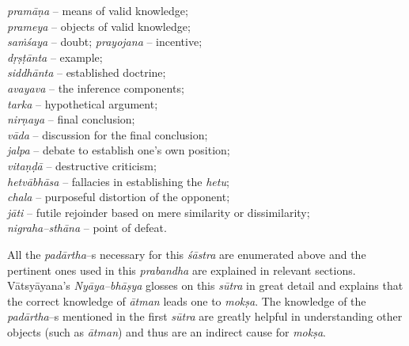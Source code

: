 \textit{pramāṇa} – means of valid knowledge;\\
 \textit{prameya} – objects of valid knowledge;\\
  \textit{saṁśaya} – doubt; \textit{prayojana} – incentive;\\
  \textit{dṛṣṭānta} – example;\\
   \textit{siddhānta} – established doctrine; \\
   \textit{avayava} – the inference components; \\
   \textit{tarka} – hypothetical argument;\\
    \textit{nirṇaya} – final conclusion; \\
    \textit{vāda} – discussion for the final conclusion;\\
     \textit{jalpa} – debate to establish one’s own position;\\
      \textit{vitaṇḍā} – destructive criticism;\\
       \textit{hetvābhāsa} – fallacies in establishing the \textit{hetu};\\
        \textit{chala} – purposeful distortion of the opponent; \\
        \textit{jāti} – futile rejoinder based on mere similarity or dissimilarity; \\
        \textit{nigraha–sthāna} – point of defeat.

All the \textit{padārtha}–s necessary for this\textit{ śāstra} are enumerated above and the pertinent ones used in this \textit{prabandha} are explained in relevant sections. Vātsyāyana’s \textit{Nyāya–bhāṣya} glosses on this \textit{sūtra} in great detail and explains that the correct knowledge of \textit{ātman} leads one to \textit{mokṣa}. The knowledge of the \textit{padārtha}–s mentioned in the first \textit{sūtra} are greatly helpful in understanding other objects (such as \textit{ātman}) and thus are an indirect cause for \textit{mokṣa}.

